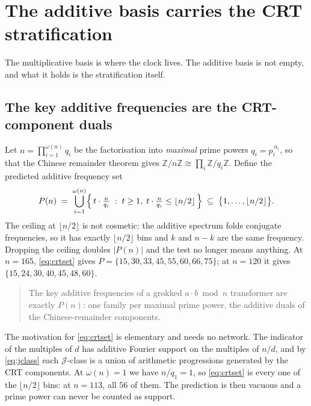 \section{The additive basis carries the CRT stratification}
\label{sec:crt}

The multiplicative basis is where the clock lives. The additive basis is not empty, and what
it holds is the stratification itself.

\subsection{The key additive frequencies are the CRT-component duals}
\label{sec:crt-law}

Let $n = \prod_{i=1}^{\omega(n)} q_{i}$ be the factorisation into \emph{maximal} prime powers
$q_{i} = p_{i}^{\,\alpha_{i}}$, so that the Chinese remainder theorem gives
$\mathbb{Z}/n\mathbb{Z} \cong \prod_{i} \mathbb{Z}/q_{i}\mathbb{Z}$. Define the predicted
additive frequency set
\begin{equation}
  \label{eq:crtset}
  P(n) \;=\; \bigcup_{i=1}^{\omega(n)}
  \Bigl\{\, t \cdot \tfrac{n}{q_{i}} \;:\; t \ge 1,\; t \cdot \tfrac{n}{q_{i}} \le \lfloor n/2 \rfloor \,\Bigr\}
  \;\subseteq\; \bigl\{1, \dots, \lfloor n/2 \rfloor \bigr\}.
\end{equation}
The ceiling at $\lfloor n/2 \rfloor$ is not cosmetic: the additive spectrum folds conjugate
frequencies, so it has exactly $\lfloor n/2 \rfloor$ bins and $k$ and $n - k$ are the same
frequency. Dropping the ceiling doubles $|P(n)|$ and the test no longer means anything. At
$n = 165$, \eqref{eq:crtset} gives $P = \{15, 30, 33, 45, 55, 60, 66, 75\}$; at $n = 120$ it
gives $\{15, 24, 30, 40, 45, 48, 60\}$.

\begin{quote}
The key additive frequencies of a grokked $a \cdot b \bmod n$ transformer are exactly $P(n)$:
one family per maximal prime power, the additive duals of the Chinese-remainder
components.
\end{quote}

The motivation for \eqref{eq:crtset} is elementary and needs no network. The indicator of the multiples of
$d$ has additive Fourier support on the multiples of $n/d$, and by \eqref{eq:jclass} each
$\mathcal{J}$-class is a union of arithmetic progressions generated by the CRT components.
At $\omega(n) = 1$ we have $n/q_{1} = 1$, so \eqref{eq:crtset} is every one of the
$\lfloor n/2 \rfloor$ bins: at $n = 113$, all $56$ of them. The prediction is then vacuous
and a prime power can never be counted as support.

